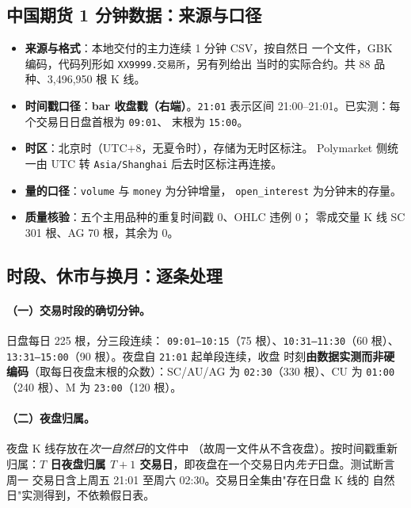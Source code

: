 \documentclass[11pt, a4paper]{ctexart}
\newcommand{\code}[1]{\texttt{\small #1}}
\begin{document}
\subsection{中国期货 1 分钟数据：来源与口径}\label{sec:fut}

\begin{itemize}
\item \textbf{来源与格式}：本地交付的主力连续 1 分钟 CSV，按自然日
  一个文件，GBK 编码，代码列形如 \code{XX9999.交易所}，另有列给出
  当时的实际合约。共 88 品种、3{,}496{,}950 根 K 线。
\item \textbf{时间戳口径}：\textbf{bar 收盘戳（右端）}。\code{21:01}
  表示区间 21:00--21:01。已实测：每个交易日日盘首根为 \code{09:01}、
  末根为 \code{15:00}。
\item \textbf{时区}：北京时（UTC$+8$，无夏令时），存储为无时区标注。
  Polymarket 侧统一由 UTC 转 \code{Asia/Shanghai} 后去时区标注再连接。
\item \textbf{量的口径}：\code{volume} 与 \code{money} 为分钟增量，
  \code{open\_interest} 为分钟末的存量。
\item \textbf{质量核验}：五个主用品种的重复时间戳 0、OHLC 违例 0；
  零成交量 K 线 SC 301 根、AG 70 根，其余为 0。
\end{itemize}

\subsection{时段、休市与换月：逐条处理}\label{sec:session}

\paragraph{（一）交易时段的确切分钟。}日盘每日 225 根，分三段连续：
\code{09:01--10:15}（75 根）、\code{10:31--11:30}（60 根）、
\code{13:31--15:00}（90 根）。夜盘自 \code{21:01} 起单段连续，收盘
时刻\textbf{由数据实测而非硬编码}（取每日夜盘末根的众数）：SC/AU/AG
为 \code{02:30}（330 根）、CU 为 \code{01:00}（240 根）、M 为
\code{23:00}（120 根）。

\paragraph{（二）夜盘归属。}夜盘 K 线存放在\emph{次一自然日}的文件中
（故周一文件从不含夜盘）。按时间戳重新归属：\textbf{$T$ 日夜盘归属
$T+1$ 交易日}，即夜盘在一个交易日内\emph{先于}日盘。测试断言周一
交易日含上周五 21:01 至周六 02:30。交易日全集由"存在日盘 K 线的
自然日"实测得到，不依赖假日表。
\end{document}
